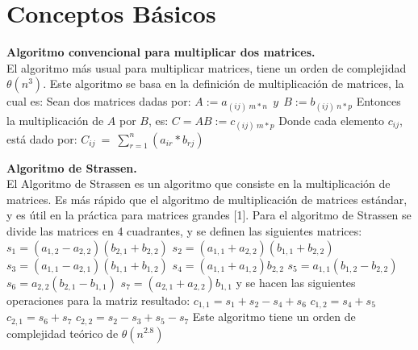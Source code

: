 \documentclass[12pt]{report}
\begin{document}
	\section{Conceptos Básicos}
	\textbf{Algoritmo convencional para multiplicar dos matrices.}\\
	
	El algoritmo más usual para multiplicar matrices, tiene un orden de complejidad $\theta (n^3)$. Este algoritmo se basa en la definición de multiplicación de matrices, la cual es: \newline \newline
	Sean dos matrices dadas por: \newline
	$A := a_{(ij) \ m*n} \ \ y \ \ B := b_{(ij) \ n*p} $ \newline \newline 
	Entonces la multiplicación de $A$ por $B$, es: \newline 
	$C = AB := c_{(ij) \ m*p}$ \newline \newline
	Donde cada elemento $c_{ij}$, está dado por: \newline 
	$C_{ij} \ = \ \sum_{r=1}^{n} (a_{ir}*b_{rj})$ \newline \newline
		
	\textbf{Algoritmo de Strassen.}\\
	
El Algoritmo de Strassen es un algoritmo que consiste en la multiplicación de matrices. Es más rápido que el algoritmo de multiplicación de matrices estándar, y es útil en la práctica para matrices grandes [1]. Para el algoritmo de Strassen se divide las matrices en 4 cuadrantes, y se definen las siguientes matrices:\newline
$s_{1}=(a_{1,2}-a_{2,2})(b_{2,1}+b_{2,2})$\newline
$s_{2}=(a_{1,1}+a_{2,2})(b_{1,1}+b_{2,2})$\newline
$s_{3}=(a_{1,1}-a_{2,1})(b_{1,1}+b_{1,2})$\newline
$s_{4}=(a_{1,1}+a_{1,2})b_{2,2}$\newline
$s_{5}=a_{1,1}(b_{1,2}-b_{2,2})$\newline
$s_{6}=a_{2,2}(b_{2,1}-b_{1,1})$\newline
$s_{7}=(a_{2,1}+a_{2,2})b_{1,1}$\newline
y se hacen las siguientes operaciones para la matriz resultado:\newline
$c_{1,1}=s_{1}+s_{2}-s_{4}+s_{6}$\newline
$c_{1,2}=s_{4}+s_{5}$\newline
$c_{2,1}=s_{6}+s_{7}$\newline
$c_{2,2}=s_{2}-s_{3}+s_{5}-s_{7}$\newline
Este algoritmo tiene un orden de complejidad teórico de $\theta (n^{2.8})$\newpage
		
\end{document}
